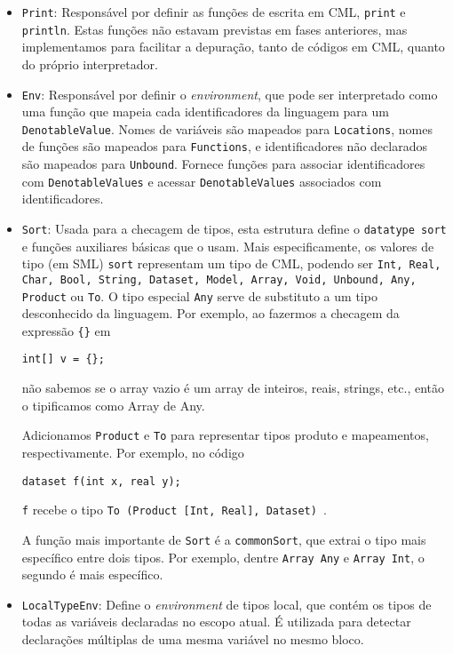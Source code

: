 \documentclass[12pt]{article}
\begin{document}
\begin{enumerate}
\begin{itemize}
\item \texttt{Print}: Responsável por definir as funções de escrita em CML, \texttt{print} e \texttt{println}. Estas funções não estavam previstas em fases anteriores, mas implementamos para facilitar a depuração, tanto de códigos em CML, quanto do próprio interpretador.
 
\item \texttt{Env}: Responsável por definir o \textit{environment}, que pode ser interpretado como uma função que mapeia cada identificadores da linguagem para um \texttt{DenotableValue}. Nomes de variáveis são mapeados para \texttt{Locations}, nomes de funções são mapeados para \texttt{Functions}, e identificadores não declarados são mapeados para \texttt{Unbound}. Fornece funções para associar identificadores com \texttt{DenotableValues} e acessar \texttt{DenotableValues} associados com identificadores.

\item \texttt{Sort}: Usada para a checagem de tipos, esta estrutura define o \texttt{datatype sort} e funções auxiliares básicas que o usam. Mais especificamente, os valores de tipo (em SML) \texttt{sort} representam um tipo de CML, podendo ser \texttt{Int, Real, Char, Bool, String, Dataset, Model, Array, Void, Unbound, Any, Product} ou \texttt{To}. O tipo especial \texttt{Any} serve de substituto a um tipo desconhecido da linguagem. Por exemplo, ao fazermos a checagem da expressão \texttt{\{\}} em

\begin{Verbatim}
int[] v = {};
\end{Verbatim}

não sabemos se o array vazio é um array de inteiros, reais, strings, etc., então o tipificamos como Array de Any.

Adicionamos \texttt{Product} e \texttt{To} para representar tipos produto e mapeamentos, respectivamente. Por exemplo, no código

\begin{Verbatim}
dataset f(int x, real y);
\end{Verbatim}

\texttt{f} recebe o tipo \texttt{To (Product [Int, Real], Dataset) }.

A função mais importante de \texttt{Sort} é a \texttt{commonSort}, que extrai o tipo mais específico entre dois tipos. Por exemplo, dentre \texttt{Array Any} e \texttt{Array Int}, o segundo é mais específico.

\item \texttt{LocalTypeEnv}: Define o \textit{environment} de tipos local, que contém os tipos de todas as variáveis declaradas no escopo atual. É utilizada para detectar declarações múltiplas de uma mesma variável no mesmo bloco.


\end{itemize}
\end{enumerate}
\end{document}
